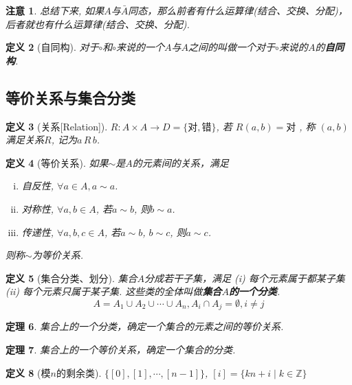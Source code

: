 \documentclass[UTF8]{ctexart}
\newtheorem{Definition}{定义}%
\newtheorem{Theorem}[Definition]{定理}
\newtheorem{Remark}[Definition]{注意}
\begin{document}
\begin{Remark}
总结下来, 如果$A$与$\bar{A}$同态，那么前者有什么运算律(结合、交换、分配)，后者就也有什么运算律(结合、交换、分配).
\end{Remark}

\begin{Definition}[自同构]
对于$\circ$和$\circ$来说的一个$A$与$A$之间的\;\;叫做一个对于$\circ$来说的$A$的\textbf{自同构}.
\end{Definition}

\subsection{等价关系与集合分类}

\begin{Definition}[关系\mbox{[Relation]}]
$R: A \times A \rightarrow D = \{\text{对}, \text{错}\} $, 
若
$R(a, b) = \text{对}$
, 称
$(a, b)$
满足关系$R$, 记为$a \, R \, b$.
\end{Definition}

\begin{Definition}[等价关系]
如果$\sim$是$A$的元素间的关系，满足 
\begin{enumerate}[i)]
\item 自反性, $\forall a \in A, a \sim a$.
\item 对称性, $\forall a, b \in A$, 若$a \sim b$, 则$b \sim a$.
\item 传递性, $\forall a, b, c \in A$, 若$a \sim b$, $b\sim c$, 则$a \sim c$.
\end{enumerate}
则称$\sim$为等价关系.
\end{Definition}

\begin{Definition}[集合分类、划分]
集合$A$分成若干子集，满足 (i) 每个元素属于都某子集 (ii) 每个元素只属于某子集. 这些类的全体叫做\textbf{集合$A$的一个分类}.
$$ A = A_1 \cup A_2 \cup \cdots \cup A_n, A_i \cap A_j = \emptyset, i \neq j$$
\end{Definition}

\begin{Theorem}
集合上的一个分类，确定一个集合的元素之间的等价关系.
\end{Theorem}

\begin{Theorem}
集合上的一个等价关系，确定一个集合的分类.
\end{Theorem}

\begin{Definition}[模$n$的剩余类]
$ \{ [0], [1], \cdots, [n-1] \} $, $[i] = \{ k n + i \mid k \in \mathbb{Z} \}$
\end{Definition}
\end{document}
